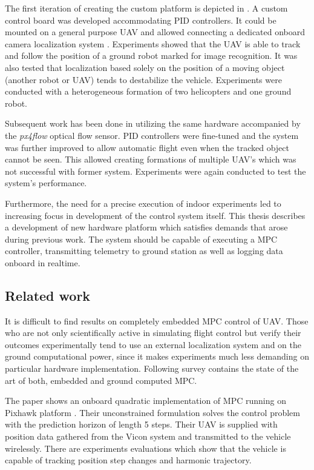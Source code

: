The first iteration of creating the custom platform is depicted in \citep{baca2013}. A custom control board was developed accommodating PID controllers. It could be mounted on a general purpose UAV and allowed connecting a dedicated onboard camera localization system \citep{faigl2013low}. Experiments showed that the UAV is able to track and follow the position of a ground robot marked for image recognition. It was also tested that localization based solely on the position of a moving object (another robot or UAV) tends to destabilize the vehicle. Experiments were conducted with a heterogeneous formation of two helicopters and one ground robot.

Subsequent work has been done in \citep{endrych2014} utilizing the same hardware accompanied by the \textit{px4flow} optical flow sensor. PID controllers were fine-tuned and the system was further improved to allow automatic flight even when the tracked object cannot be seen. This allowed creating formations of multiple UAV's which was not successful with former system. Experiments were again conducted to test the system's performance.

Furthermore, the need for a precise execution of indoor experiments led to increasing focus in development of the control system itself. This thesis describes a development of new hardware platform which satisfies demands that arose during previous work. The system should be capable of executing a MPC controller, transmitting telemetry to ground station as well as logging data onboard in realtime. 

\subsection{Related work}

It is difficult to find results on completely embedded MPC control of UAV. Those who are not only scientifically active in simulating flight control but verify their outcomes experimentally tend to use an external localization system and on the ground computational power, since it makes experiments much less demanding on particular hardware implementation. Following survey contains the state of the art of both, embedded and ground computed MPC.

The paper \citep{bangura2014realtimempc} shows an onboard quadratic implementation of MPC running on Pixhawk platform \citep{pixhawk}. Their unconstrained formulation solves the control problem with the prediction horizon of length 5 steps. Their UAV is supplied with position data gathered from the Vicon system and transmitted to the vehicle wirelessly. There are experiments evaluations which show that the vehicle is capable of tracking position step changes and harmonic trajectory.

